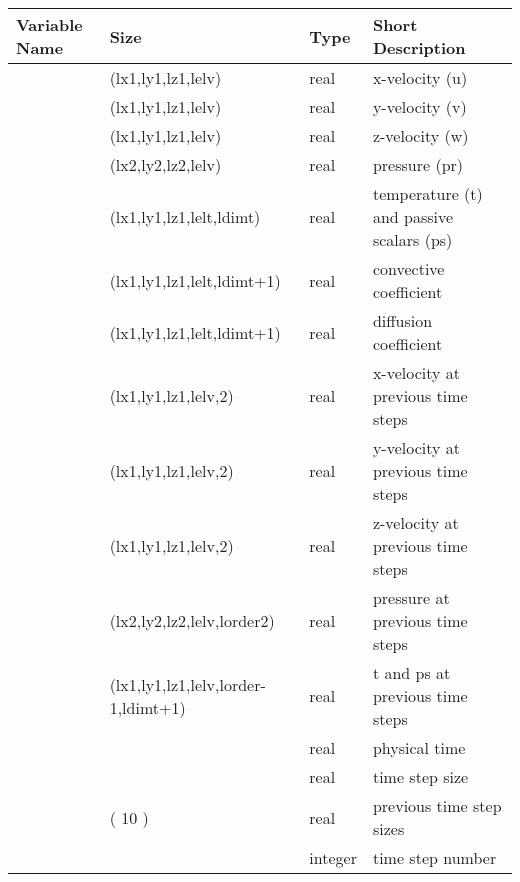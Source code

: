 \documentclass[letterpaper,10pt,english]{sphinxmanual}
\begin{document}
\begin{savenotes}\sphinxattablestart
\centering
\begin{tabulary}{\linewidth}[t]{|T|T|T|T|}
\hline
\sphinxstyletheadfamily 
Variable Name
&\sphinxstyletheadfamily 
Size
&\sphinxstyletheadfamily 
Type
&\sphinxstyletheadfamily 
Short Description
\\
\hline
{}
&
(lx1,ly1,lz1,lelv)
&
real
&
x-velocity (u)
\\
\hline
{}
&
(lx1,ly1,lz1,lelv)
&
real
&
y-velocity (v)
\\
\hline
{}
&
(lx1,ly1,lz1,lelv)
&
real
&
z-velocity (w)
\\
\hline
{}
&
(lx2,ly2,lz2,lelv)
&
real
&
pressure (pr)
\\
\hline
{}
&
(lx1,ly1,lz1,lelt,ldimt)
&
real
&
temperature (t) and passive scalars (ps)
\\
\hline
{}
&
(lx1,ly1,lz1,lelt,ldimt+1)
&
real
&
convective coefficient
\\
\hline
{}
&
(lx1,ly1,lz1,lelt,ldimt+1)
&
real
&
diffusion coefficient
\\
\hline
{}
&
(lx1,ly1,lz1,lelv,2)
&
real
&
x-velocity at previous time steps
\\
\hline
{}
&
(lx1,ly1,lz1,lelv,2)
&
real
&
y-velocity at previous time steps
\\
\hline
{}
&
(lx1,ly1,lz1,lelv,2)
&
real
&
z-velocity at previous time steps
\\
\hline
{}
&
(lx2,ly2,lz2,lelv,lorder2)
&
real
&
pressure at previous time steps
\\
\hline
{}
&
(lx1,ly1,lz1,lelv,lorder-1,ldimt+1)
&
real
&
t and ps at previous time steps
\\
\hline
{}
&
\textendash{}
&
real
&
physical time
\\
\hline
{}
&
\textendash{}
&
real
&
time step size
\\
\hline
{}
&
( 10 )
&
real
&
previous time step sizes
\\
\hline
{}
&
\textendash{}
&
integer
&
time step number
\\
\hline
\end{tabulary}
\par
\sphinxattableend\end{savenotes}
\end{document}
